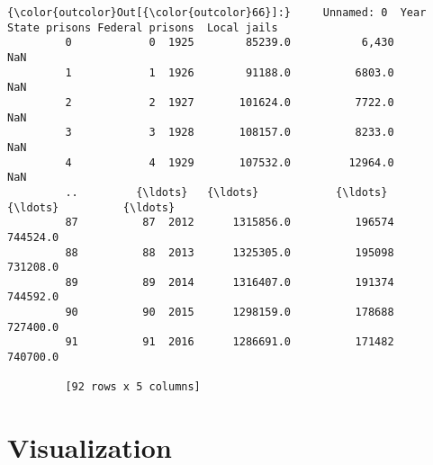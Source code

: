 \documentclass[11pt]{article}
\begin{document}
\begin{Verbatim}[commandchars=\\\{\}]
{\color{outcolor}Out[{\color{outcolor}66}]:}     Unnamed: 0  Year  State prisons Federal prisons  Local jails
         0            0  1925        85239.0           6,430          NaN
         1            1  1926        91188.0          6803.0          NaN
         2            2  1927       101624.0          7722.0          NaN
         3            3  1928       108157.0          8233.0          NaN
         4            4  1929       107532.0         12964.0          NaN
         ..         {\ldots}   {\ldots}            {\ldots}             {\ldots}          {\ldots}
         87          87  2012      1315856.0          196574     744524.0
         88          88  2013      1325305.0          195098     731208.0
         89          89  2014      1316407.0          191374     744592.0
         90          90  2015      1298159.0          178688     727400.0
         91          91  2016      1286691.0          171482     740700.0
         
         [92 rows x 5 columns]
\end{Verbatim}
            
    \hypertarget{visualization}{%
\section{Visualization}\label{visualization}}
\end{document}
